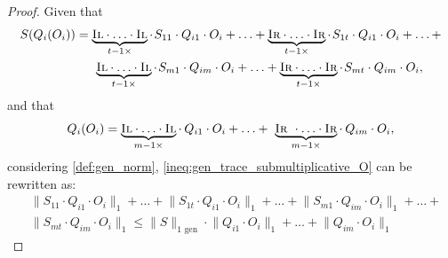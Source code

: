 \begin{proof}
Given that
\begin{equation}
\begin{split} 
  S (Q_i (O_i)) & = \underbrace{\textsc{Il} \cdot \ldots \cdot \textsc{Il}}_{t-1 \times} \cdot \hspace{1pt} S_{11} \cdot Q_{i1} \cdot O_{i} + \ldots + \underbrace{\textsc{Ir} \cdot \ldots \cdot \textsc{Ir}}_{t-1 \times} \cdot \hspace{1pt} S_{1t} \cdot Q_{i1} \cdot O_{i} + \ldots +      \\
  & \hspace{15pt}  \underbrace{\textsc{Il} \cdot \ldots \cdot \textsc{Il}}_{t-1 \times}\cdot \hspace{1pt} S_{m1} \cdot Q_{im} \cdot O_{i} + \ldots + \underbrace{\textsc{Ir} \cdot \ldots \cdot \textsc{Ir}}_{t-1 \times} \cdot \hspace{1pt} S_{mt} \cdot Q_{im} \cdot O_{i},
\end{split}
\end{equation}
and that
\begin{equation}
  \begin{split}
     Q_i (O_i) = \underbrace{\textsc{Il} \cdot \ldots \cdot \textsc{Il}}_{m-1 \times} \cdot \hspace{2pt} Q_{i1} \cdot O_{i} + \ldots +  \underbrace{\textsc{Ir } \cdot \ldots \cdot \textsc{Ir}}_{m-1 \times} \cdot \hspace{2pt} Q_{im} \cdot O_{i},
  \end{split}
\end{equation}
considering \autoref{def:gen_norm}, \autoref{ineq:gen_trace_submultiplicative_O} can be rewritten as:
\begin{equation}
  \begin{split}
  &\lVert S_{11} \cdot Q_{i1} \cdot O_{i} \rVert_{1} + \ldots + \lVert S_{1t} \cdot Q_{i1} \cdot O_{i} \rVert_{1} + \ldots + \lVert S_{m1} \cdot Q_{im} \cdot O_{i} \rVert_{1} + \ldots +  \\
  &  \lVert S_{mt} \cdot Q_{im} \cdot O_{i} \rVert_{1} \leq  \lVert S  \rVert_{1 \text{ gen}} \cdot \lVert Q_{i1} \cdot O_{i} \rVert_{1} + \ldots + \lVert Q_{im} \cdot O_{i} \rVert_{1}
  \end{split}
\end{equation}


\end{proof}
